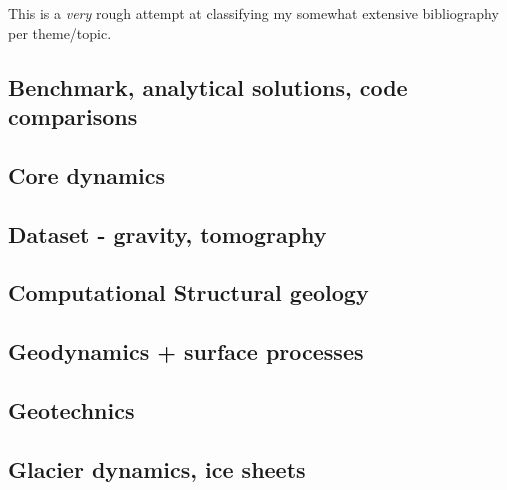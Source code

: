 This is a {\it very} rough attempt at classifying my somewhat extensive 
bibliography per theme/topic.
 


\subsection*{Benchmark, analytical solutions, code comparisons}

\cite{yusa84}
\cite{zhon96}
\cite{zhmt08}

\subsection*{Core dynamics}

\cite{hayu96}

\subsection*{Dataset - gravity, tomography}

\cite{hawj12}

\subsection*{Computational Structural geology}

\cite{acgf00}

\subsection*{Geodynamics + surface processes}

\cite{howa94}
\cite{avbu96}
\cite{zemk01}
\cite{alle08}
\cite{vehc13}

\subsection*{Geotechnics}

\cite{zhll03}

\subsection*{Glacier dynamics, ice sheets}

